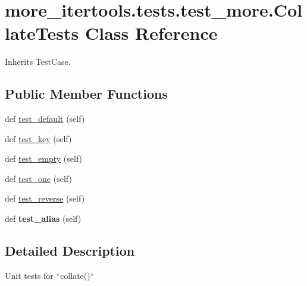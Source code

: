 \hypertarget{classmore__itertools_1_1tests_1_1test__more_1_1_collate_tests}{}\section{more\+\_\+itertools.\+tests.\+test\+\_\+more.\+Collate\+Tests Class Reference}
\label{classmore__itertools_1_1tests_1_1test__more_1_1_collate_tests}


Inherits Test\+Case.

\subsection*{Public Member Functions}
\begin{DoxyCompactItemize}
\item 
def \hyperlink{classmore__itertools_1_1tests_1_1test__more_1_1_collate_tests_a4ffe191ac974b3bf57614fbddff7a424}{test\+\_\+default} (self)
\item 
def \hyperlink{classmore__itertools_1_1tests_1_1test__more_1_1_collate_tests_a1a35a4eaecc3716352f7c572b0213511}{test\+\_\+key} (self)
\item 
def \hyperlink{classmore__itertools_1_1tests_1_1test__more_1_1_collate_tests_a6c35cfa8c76d028427b425471aab8b10}{test\+\_\+empty} (self)
\item 
def \hyperlink{classmore__itertools_1_1tests_1_1test__more_1_1_collate_tests_adc7f49d09f3ec1e62d44e94b45b13617}{test\+\_\+one} (self)
\item 
def \hyperlink{classmore__itertools_1_1tests_1_1test__more_1_1_collate_tests_aff4c0348d47702cbdb1d3f19d14282b6}{test\+\_\+reverse} (self)
\item 
\mbox{\label{classmore__itertools_1_1tests_1_1test__more_1_1_collate_tests_ae5f5c0b979ecca6e399b1b38191c59ad}} 
def {\bfseries test\+\_\+alias} (self)
\end{DoxyCompactItemize}


\subsection{Detailed Description}
\begin{DoxyVerb}Unit tests for ``collate()``\end{DoxyVerb}
 

